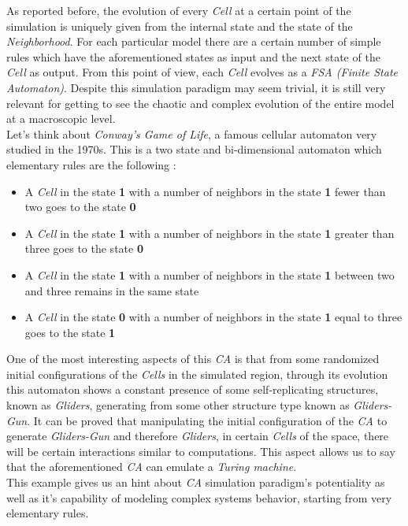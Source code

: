 \documentclass[12pt,a4paper,fleqn]{report}
\begin{document}
As reported before, the evolution of every \textit{Cell} at a certain point of the simulation is uniquely given from the internal state and the state of the \textit{Neighborhood}. For each particular model there are a certain number of simple rules which have the aforementioned states as input and the next state of the \textit{Cell} as output. From this point of view, each \textit{Cell} evolves as a \textit{FSA (Finite State Automaton)}. Despite this simulation paradigm may seem trivial, it is still very relevant for getting to see the chaotic and complex evolution of the entire model at a macroscopic level.\\
Let's think about \textit{Conway's Game of Life}, a famous cellular automaton very studied in the 1970s. This is a two state and bi-dimensional automaton which elementary rules are the following :
\begin{itemize}
\item
A \textit{Cell} in the state \textbf{1} with a number of neighbors in the state \textbf{1} fewer than two goes to the state \textbf{0}
\item
A \textit{Cell} in the state \textbf{1} with a number of neighbors in the state \textbf{1} greater than three goes to the state \textbf{0} 
\item
A \textit{Cell} in the state \textbf{1} with a number of neighbors in the state \textbf{1} between two and three remains in the same state
\item
A \textit{Cell} in the state \textbf{0} with a number of neighbors in the state \textbf{1} equal to three goes to the state \textbf{1}
\end{itemize}
One of the most interesting aspects of this \textit{CA} is that from some randomized initial configurations of the \textit{Cells} in the simulated region, through its evolution this automaton shows a constant presence of some self-replicating structures, known as \textit{Gliders}, generating from some other structure type known as \textit{Gliders-Gun}. It can be proved that manipulating the initial configuration of the \textit{CA} to generate \textit{Gliders-Gun} and therefore \textit{Gliders}, in certain \textit{Cells} of the space, there will be certain interactions similar to computations. This aspect allows us to say that the aforementioned \textit{CA} can emulate a \textit{Turing machine}.\\
This example gives us an hint about \textit{CA} simulation paradigm's potentiality as well as it's capability of modeling complex systems behavior, starting from very elementary rules.
\end{document}
